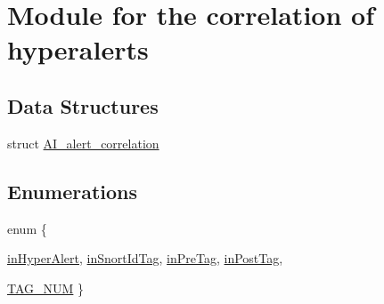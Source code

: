 \hypertarget{group__correlation}{
\section{Module for the correlation of hyperalerts}
\label{group__correlation}
}
\subsection*{Data Structures}
\begin{DoxyCompactItemize}
\item 
struct \hyperlink{structAI__alert__correlation}{AI\_\-alert\_\-correlation}
\end{DoxyCompactItemize}
\subsection*{Enumerations}
\begin{DoxyCompactItemize}
\item 
enum \{ \par
\hyperlink{group__correlation_gga06fc87d81c62e9abb8790b6e5713c55ba0b3b5f651ab0c6355666ff7b1c778af8}{inHyperAlert}, 
\hyperlink{group__correlation_gga06fc87d81c62e9abb8790b6e5713c55ba52d913c46f650f89a5da3ff4bfb7a45d}{inSnortIdTag}, 
\hyperlink{group__correlation_gga06fc87d81c62e9abb8790b6e5713c55ba828f2ec4acb20bae9b9c9fb0c5e0881f}{inPreTag}, 
\hyperlink{group__correlation_gga06fc87d81c62e9abb8790b6e5713c55baf6430d8e5b9791cca74ec3b325a8339f}{inPostTag}, 
\par
\hyperlink{group__correlation_gga06fc87d81c62e9abb8790b6e5713c55ba551d1861515058fbfe34955d4170ae67}{TAG\_\-NUM}
 \}
\end{DoxyCompactItemize}
